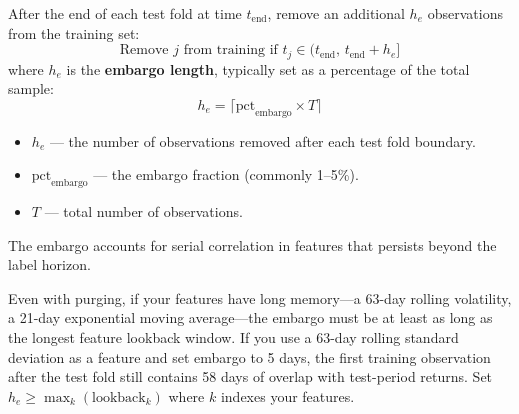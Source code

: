 \begin{definition}[Embargo]
After the end of each test fold at time $t_{\text{end}}$, remove an additional $h_e$ observations from the training set:
\begin{equation}
\text{Remove } j \text{ from training if } t_j \in (t_{\text{end}}, \, t_{\text{end}} + h_e]
\label{eq:embargo}
\end{equation}
where $h_e$ is the \textbf{embargo length}, typically set as a percentage of the total sample:
\begin{equation}
h_e = \lceil \text{pct}_{\text{embargo}} \times T \rceil
\label{eq:embargo-length}
\end{equation}
\begin{itemize}[nosep]
  \item $h_e$ --- the number of observations removed after each test fold boundary.
  \item $\text{pct}_{\text{embargo}}$ --- the embargo fraction (commonly 1--5\%).
  \item $T$ --- total number of observations.
\end{itemize}
The embargo accounts for serial correlation in features that persists beyond the label horizon.
\end{definition}

\begin{warning}
Even with purging, if your features have long memory---a 63-day rolling volatility, a 21-day exponential moving average---the embargo must be at least as long as the longest feature lookback window. If you use a 63-day rolling standard deviation as a feature and set embargo to 5 days, the first training observation after the test fold still contains 58 days of overlap with test-period returns. Set $h_e \geq \max_k(\text{lookback}_k)$ where $k$ indexes your features.
\end{warning}

